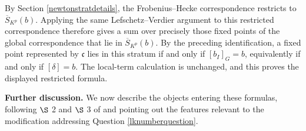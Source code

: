 \documentclass[11pt,a4paper]{article}
\theoremstyle{definition}
\theoremstyle{plain}
\theoremstyle{remark}
\theoremstyle{plain}
\begin{document}
By Section \ref{newtonstratdetails}, the Frobenius--Hecke correspondence restricts to $\overline{S}_{K^p}(b)$. Applying the same Lefschetz--Verdier argument to this restricted correspondence therefore gives a sum over precisely those fixed points of the global correspondence that lie in $\overline{S}_{K^p}(b)$. By the preceding identification, a fixed point represented by $\mathfrak c$ lies in this stratum if and only if $[b_I]_G=b$, equivalently if and only if $[\delta]=b$. The local-term calculation is unchanged, and this proves the displayed restricted formula.

\textbf{Further discussion.}
We now describe the objects entering these formulas, following $\S$ 2 and $\S$ 3 of \cite{MR1044820} and pointing out the features relevant to the modification addressing Question \ref{lknumberquestion}.
\end{document}
